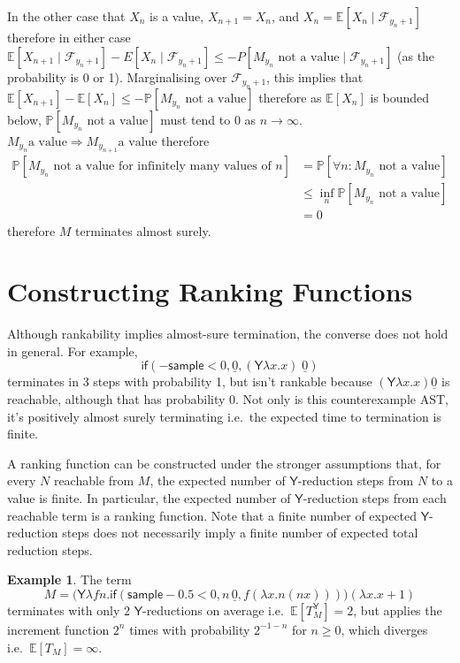 \documentclass{article}
\newcommand\expect[1]{\mathbb{E}[#1]}
\newcommand{\tY}{\mathsf{Y}}
\newcommand{\tif}[3]{\mathsf{if}(#1, #2, #3)} %
\newcommand{\tsample}{\mathsf{sample}}
\theoremstyle{definition}
\newtheorem{example}{Example}
\theoremstyle{lemma}
\theoremstyle{remark}
\begin{document}
In the other case that $X_n$ is a value, $X_{n+1} = X_n$, and $X_n = \mathbb E[X_n \mid \mathcal F_{y_n+1}]$ therefore in either case $\mathbb E[X_{n+1} \mid \mathcal F_{y_n+1}] - E[X_n \mid \mathcal F_{y_n+1}] \leq \mathbb -P[M_{y_n} \text{ not a value} \mid \mathcal F_{y_n+1}]$ (as the probability is 0 or 1). Marginalising over $\mathcal F_{y_n+1}$, this implies that $\mathbb{E}[X_{n+1}] - \mathbb{E}[X_{n}] \leq -\mathbb P[M_{y_n} \text{ not a value}]$ therefore as $\mathbb{E}[X_n]$ is bounded below, $\mathbb P[M_{y_n} \text{ not a value}]$ must tend to 0 as $n \to \infty$. $M_{y_n} \text{a value} \Rightarrow M_{y_{n+1}} \text{a value}$ therefore 
\begin{align*}
\mathbb P[M_{y_n} \text{ not a value for infinitely many values of $n$}]  
& = \mathbb P[\forall n: M_{y_n} \text{ not a value}] \\
& \leq \inf_n \mathbb P[M_{y_n} \text{ not a value}] \\
& = 0
\end{align*} 
therefore $M$ terminates almost surely.



\section{Constructing Ranking Functions}
Although rankability implies almost-sure termination, the converse does not hold in general. For example,
\begin{equation}
\tif{{-}\tsample < 0}{\underline{0}}{(\tY \lambda x. x) \; \underline 0}
\label{ex:0 probability reachable}
\end{equation}
terminates in 3 steps with probability 1, but isn't rankable because $(\tY \lambda x. x) \underline 0$ is reachable, although that has probability 0. 
Not only is this counterexample AST, it's positively almost surely terminating i.e.~the expected time to termination is finite.

A ranking function can be constructed under the stronger assumptions that, for every $N$ reachable from $M$, the expected number of $\tY$-reduction steps from $N$ to a value is finite. In particular, the expected number of $\tY$-reduction steps from each reachable term is a ranking function. Note that a finite number of expected $\tY$-reduction steps does not necessarily imply a finite number of expected total reduction steps.

\begin{example}
\label{ex:tY finite does not imply t finite}
The term
\[
M = \big(\tY \lambda f n. \tif{\tsample - 0.5 < 0}{n \, \underline 0}{f (\lambda x. n (n x))}\big) (\lambda x. x+1)
\] 
terminates with only 2 $\tY$-reductions on average i.e.~$\expect{T_M^\tY} = 2$, but applies the increment function $2^n$ times with probability $2^{-1-n}$ for $n \geq 0$, which diverges i.e.~$\expect{T_M} = \infty$.
\end{example}
\end{document}
